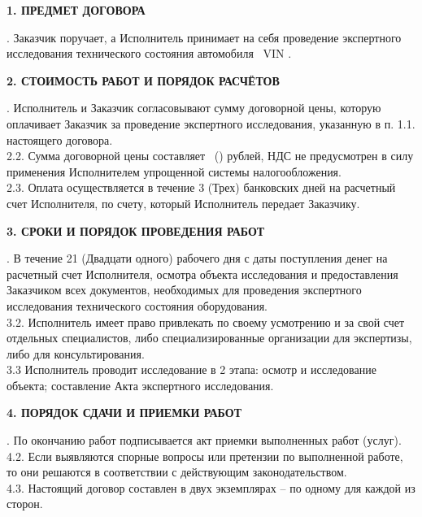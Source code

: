 \documentclass[a4paper,12pt,english,notitlepage]{report}
\begin{document}
         
\begin{center}
	\textbf{1. ПРЕДМЕТ ДОГОВОРА}
\end{center}
\vspace{-3mm}
 . Заказчик поручает, а Исполнитель принимает на себя проведение экспертного исследования технического состояния  автомобиля  \, VIN \vin.


\begin{center}
	\textbf{2. СТОИМОСТЬ РАБОТ И ПОРЯДОК РАСЧЁТОВ}
\end{center}
\vspace{-3mm}
 . Исполнитель и Заказчик согласовывают сумму договорной цены, которую оплачивает Заказчик   за проведение экспертного исследования, указанную в п. 1.1. настоящего договора.\\ 
2.2. Сумма договорной цены составляет ~(\!\!\!\!\!\!) рублей, НДС не предусмотрен в силу применения Исполнителем упрощенной системы налогообложения.\\
2.3. Оплата осуществляется в течение 3 (Трех) банковских дней на расчетный счет Исполнителя, по счету, который Исполнитель передает Заказчику.



\begin{center}
	\textbf{3. СРОКИ И ПОРЯДОК ПРОВЕДЕНИЯ РАБОТ}
\end{center}
\vspace{-3mm}
 . В течение 21 (Двадцати одного) рабочего дня с даты поступления денег на расчетный счет
Исполнителя, осмотра объекта исследования и предоставления Заказчиком всех документов,
необходимых для проведения экспертного исследования технического состояния оборудования.\\
3.2. Исполнитель имеет право привлекать по своему усмотрению и за свой счет отдельных 
специалистов, либо специализированные организации для экспертизы, либо для консультирования.\\
3.3 Исполнитель проводит исследование в 2 этапа: осмотр и исследование объекта; составление Акта экспертного исследования.

\begin{center}
	\textbf{4. ПОРЯДОК СДАЧИ И ПРИЕМКИ РАБОТ}
\end{center}
\vspace{-3mm}
 . По окончанию работ подписывается акт приемки выполненных работ (услуг).\\
4.2. Если выявляются спорные вопросы или претензии по выполненной работе, то они решаются в соответствии с действующим законодательством.\\
4.3. Настоящий договор составлен в двух экземплярах – по одному для каждой из сторон.
\end{document}
